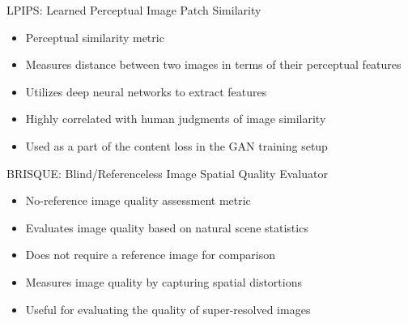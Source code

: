\documentclass{beamer}
\begin{document}
\begin{frame}{LPIPS: Learned Perceptual Image Patch Similarity}
\begin{itemize}
  \item Perceptual similarity metric
  \item Measures distance between two images in terms of their perceptual features
  \item Utilizes deep neural networks to extract features
  \item Highly correlated with human judgments of image similarity
  \item Used as a part of the content loss in the GAN training setup
\end{itemize}
\end{frame}

\begin{frame}{BRISQUE: Blind/Referenceless Image Spatial Quality Evaluator}
\begin{itemize}
  \item No-reference image quality assessment metric
  \item Evaluates image quality based on natural scene statistics
  \item Does not require a reference image for comparison
  \item Measures image quality by capturing spatial distortions
  \item Useful for evaluating the quality of super-resolved images
\end{itemize}
\end{frame}
\end{document}
